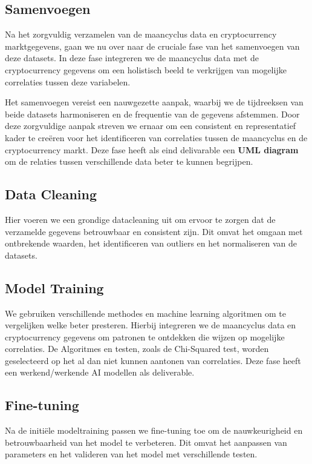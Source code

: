 \documentclass{hogent-article}
\begin{document}
\subsection{Samenvoegen}
Na het zorgvuldig verzamelen van de maancyclus data en cryptocurrency marktgegevens, gaan we nu over naar de cruciale fase van het samenvoegen van deze datasets. In deze fase integreren we de maancyclus data met de cryptocurrency gegevens om een holistisch beeld te verkrijgen van mogelijke correlaties tussen deze variabelen.

Het samenvoegen vereist een nauwgezette aanpak, waarbij we de tijdreeksen van beide datasets harmoniseren en de frequentie van de gegevens afstemmen. Door deze zorgvuldige aanpak streven we ernaar om een consistent en representatief kader te creëren voor het identificeren van correlaties tussen de maancyclus en de cryptocurrency markt.
Deze fase heeft als eind delivarable een \textbf{UML diagram} om de relaties tussen verschillende data beter te kunnen begrijpen.

\subsection{Data Cleaning}
Hier voeren we een grondige datacleaning uit om ervoor te zorgen dat de verzamelde gegevens betrouwbaar en consistent zijn. Dit omvat het omgaan met ontbrekende waarden, het identificeren van outliers en het normaliseren van de datasets.

\subsection{Model Training} 
We gebruiken verschillende methodes en machine learning algoritmen om te vergelijken welke beter presteren. Hierbij integreren we de maancyclus data en cryptocurrency gegevens om patronen te ontdekken die wijzen op mogelijke correlaties. De Algoritmes en testen, zoals de Chi-Squared test, worden geselecteerd op het al dan niet kunnen aantonen van correlaties.
Deze fase heeft een werkend/werkende AI modellen als deliverable.

\subsection{Fine-tuning}
Na de initiële modeltraining passen we fine-tuning toe om de nauwkeurigheid en betrouwbaarheid van het model te verbeteren. Dit omvat het aanpassen van parameters en het valideren van het model met verschillende testen.
\end{document}
